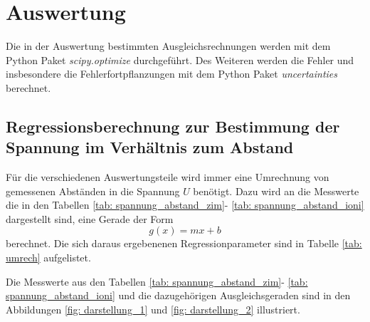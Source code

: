 \section{Auswertung}
Die in der Auswertung bestimmten Ausgleichsrechnungen werden mit
dem Python Paket \emph{scipy.optimize}\cite{scipy} durchgeführt.
Des Weiteren werden die Fehler und insbesondere die Fehlerfortpflanzungen
mit dem Python Paket \emph{uncertainties}\cite{uncertainties} berechnet.

\subsection{Regressionsberechnung zur Bestimmung der Spannung im Verhältnis zum Abstand}\label{sec: ausgleich}

Für die verschiedenen Auswertungsteile wird immer eine Umrechnung von gemessenen Abständen
in die Spannung $U$ benötigt. Dazu wird an die Messwerte die in den Tabellen \ref{tab: spannung_abstand_zim}- \ref{tab: spannung_abstand_ioni} dargestellt sind,
eine Gerade der Form
\begin{equation}
  \label{eq: gerade}
  g(x)=mx+b
\end{equation}
berechnet.
Die sich daraus ergebenenen Regressionparameter sind in Tabelle \ref{tab: umrech} aufgelistet.
\FloatBarrier





Die Messwerte aus den Tabellen \ref{tab: spannung_abstand_zim}- \ref{tab: spannung_abstand_ioni} und die dazugehörigen Ausgleichsgeraden sind in
den Abbildungen \ref{fig: darstellung_1} und \ref{fig: darstellung_2} illustriert.
